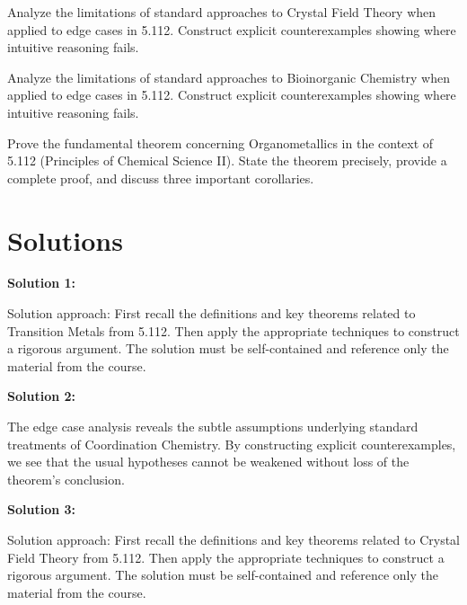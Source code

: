 \documentclass[12pt,a4paper]{exam}
\begin{document}
\begin{questions}
\question[2]
Analyze the limitations of standard approaches to Crystal Field Theory when applied to edge cases in 5.112. Construct explicit counterexamples showing where intuitive reasoning fails.

\vspace{0.3cm}

\question[3]
Analyze the limitations of standard approaches to Bioinorganic Chemistry when applied to edge cases in 5.112. Construct explicit counterexamples showing where intuitive reasoning fails.

\vspace{0.3cm}

\question[3]
Prove the fundamental theorem concerning Organometallics in the context of 5.112 (Principles of Chemical Science II). State the theorem precisely, provide a complete proof, and discuss three important corollaries.

\vspace{0.3cm}

\end{questions}

\newpage
\section*{Solutions}

\textbf{Solution 1:}

Solution approach: First recall the definitions and key theorems related to Transition Metals from 5.112. Then apply the appropriate techniques to construct a rigorous argument. The solution must be self-contained and reference only the material from the course.

\vspace{0.5cm}

\textbf{Solution 2:}

The edge case analysis reveals the subtle assumptions underlying standard treatments of Coordination Chemistry. By constructing explicit counterexamples, we see that the usual hypotheses cannot be weakened without loss of the theorem's conclusion.

\vspace{0.5cm}

\textbf{Solution 3:}

Solution approach: First recall the definitions and key theorems related to Crystal Field Theory from 5.112. Then apply the appropriate techniques to construct a rigorous argument. The solution must be self-contained and reference only the material from the course.
\end{document}
